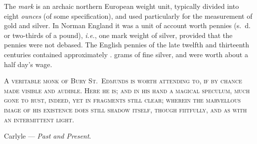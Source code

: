 \documentclass{book}
\begin{document}
{\begin{center}
\end{center}


\begin{center}

\hspace{0cm}\vspace{1.0cm}

\parbox{8cm}{

\begin{center}
\end{center}

\vspace{.25cm}
{
The \emph{mark} is an archaic northern European weight unit, typically divided into eight \emph{ounces} (of some specification), and used particularly for the measurement of gold and silver. In Norman England it was a unit of account worth  pennies (s.\ d. or two-thirds of a pound), \emph{i.e.}, one mark weight of silver, provided that the pennies were not debased. The English pennies of the late twelfth and thirteenth centuries contained approximately .\hspace{1pt} grams of fine silver, and were worth about a half day's wage.
}
}

\end{center}





\cleardoublepage

\begin{center}


\hspace{0cm}\vspace{1.4cm}

\parbox{8cm}{
{\scshape
A veritable monk of Bury St.\ Edmunds is worth attending to, if by chance made visible and audible. Here he is; and in his hand a magical speculum, much gone to rust, indeed, yet in fragments still clear; wherein the marvellous image of his existence does still shadow itself, though f\vphantom iitfully, and as with an intermittent light.\\
}

\hspace{0pt}\hfill Carlyle --- \emph{Past and Present}.
}

\end{center}

\vspace{1cm}

}
\end{document}
